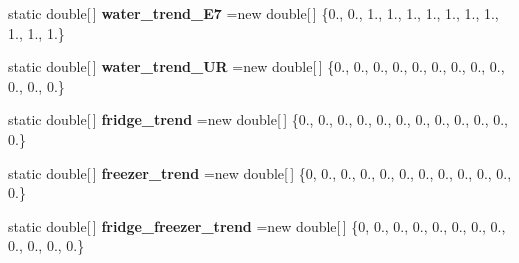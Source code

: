 \begin{DoxyCompactItemize}
\item 
\hypertarget{classuk_1_1ac_1_1dmu_1_1iesd_1_1cascade_1_1util_1_1profilegenerators_1_1_m_s_const_arrays_a263e8e0e46b1e9762a1b279694eaa857}{static double\mbox{[}$\,$\mbox{]} {\bfseries water\-\_\-trend\-\_\-\-E7} =new double\mbox{[}$\,$\mbox{]} \{0., 0., 1., 1., 1., 1., 1., 1., 1., 1., 1., 1.\}}\label{classuk_1_1ac_1_1dmu_1_1iesd_1_1cascade_1_1util_1_1profilegenerators_1_1_m_s_const_arrays_a263e8e0e46b1e9762a1b279694eaa857}

\item 
\hypertarget{classuk_1_1ac_1_1dmu_1_1iesd_1_1cascade_1_1util_1_1profilegenerators_1_1_m_s_const_arrays_a35ef58f1c85ecb51145d8e434df3665e}{static double\mbox{[}$\,$\mbox{]} {\bfseries water\-\_\-trend\-\_\-\-U\-R} =new double\mbox{[}$\,$\mbox{]} \{0., 0., 0., 0., 0., 0., 0., 0., 0., 0., 0., 0.\}}\label{classuk_1_1ac_1_1dmu_1_1iesd_1_1cascade_1_1util_1_1profilegenerators_1_1_m_s_const_arrays_a35ef58f1c85ecb51145d8e434df3665e}

\item 
\hypertarget{classuk_1_1ac_1_1dmu_1_1iesd_1_1cascade_1_1util_1_1profilegenerators_1_1_m_s_const_arrays_aba4d37757ce1efb1fcf3bab858d0350e}{static double\mbox{[}$\,$\mbox{]} {\bfseries fridge\-\_\-trend} =new double\mbox{[}$\,$\mbox{]} \{0., 0., 0., 0., 0., 0., 0., 0., 0., 0., 0., 0.\}}\label{classuk_1_1ac_1_1dmu_1_1iesd_1_1cascade_1_1util_1_1profilegenerators_1_1_m_s_const_arrays_aba4d37757ce1efb1fcf3bab858d0350e}

\item 
\hypertarget{classuk_1_1ac_1_1dmu_1_1iesd_1_1cascade_1_1util_1_1profilegenerators_1_1_m_s_const_arrays_a7b3f0cc567532e4a7d1370f57ff4d0ec}{static double\mbox{[}$\,$\mbox{]} {\bfseries freezer\-\_\-trend} =new double\mbox{[}$\,$\mbox{]} \{0, 0., 0., 0., 0., 0., 0., 0., 0., 0., 0., 0.\}}\label{classuk_1_1ac_1_1dmu_1_1iesd_1_1cascade_1_1util_1_1profilegenerators_1_1_m_s_const_arrays_a7b3f0cc567532e4a7d1370f57ff4d0ec}

\item 
\hypertarget{classuk_1_1ac_1_1dmu_1_1iesd_1_1cascade_1_1util_1_1profilegenerators_1_1_m_s_const_arrays_a11e1912321300a86dfc58199039a63b1}{static double\mbox{[}$\,$\mbox{]} {\bfseries fridge\-\_\-freezer\-\_\-trend} =new double\mbox{[}$\,$\mbox{]} \{0, 0., 0., 0., 0., 0., 0., 0., 0., 0., 0., 0.\}}\label{classuk_1_1ac_1_1dmu_1_1iesd_1_1cascade_1_1util_1_1profilegenerators_1_1_m_s_const_arrays_a11e1912321300a86dfc58199039a63b1}


\end{DoxyCompactItemize}
